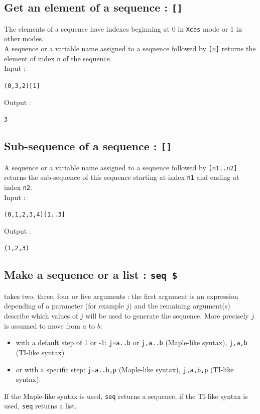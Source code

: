 \documentclass[a4paper,11pt]{book}
\begin{document}
\subsection{Get an element of a sequence : {\tt []}}\index{[]}
The elements of a sequence have indexes beginning at 0 in {\tt Xcas}
mode or 1 in other modes.\\
A sequence or a variable name assigned to a sequence
followed by {\tt [n]} returns the element of index {\tt n} of the sequence.\\
Input :
\begin{center}{\tt (0,3,2)[1]}\end{center}
Output :
\begin{center}{\tt 3}\end{center}

\subsection{Sub-sequence of a sequence : {\tt []}}\index{[]}
A sequence or a variable name assigned to a sequence followed by
{\tt [n1..n2]} returns the sub-sequence of this sequence
starting at index {\tt n1} and ending at index {\tt n2}.\\
Input :
\begin{center}{\tt (0,1,2,3,4)[1..3]}\end{center}
Output :
\begin{center}{\tt (1,2,3)}\end{center}

\subsection{Make a sequence or a list : {\tt seq \$}}
 takes two, three, four or five arguments : the first 
argument is an expression depending of a parameter (for example $j$) and  
the remaining argument(s) describe which values of $j$ will be used to
generate the sequence. More precisely $j$ is assumed to move 
from $a$ to $b$:
\begin{itemize}
\item with a default step of 1 or -1: {\tt j=a..b} or 
{\tt j,a..b} (Maple-like syntax), {\tt j,a,b} (TI-like syntax)
\item or with a specific step: 
{\tt j=a..b,p} (Maple-like syntax), {\tt j,a,b,p} (TI-like syntax).
\end{itemize}
If the Maple-like syntax is used, {\tt seq} returns a sequence,
if the TI-like syntax is used, {\tt seq} returns a list.
 
\end{document}
